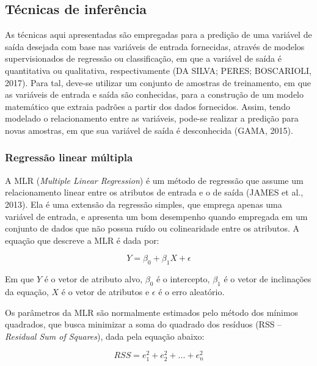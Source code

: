 
\subsection{Técnicas de inferência}

As técnicas aqui apresentadas são empregadas para a predição de uma variável de saída desejada com base nas variáveis de entrada fornecidas, através de modelos supervisionados de regressão ou classificação, em que a variável de saída é quantitativa ou qualitativa, respectivamente (DA SILVA; PERES; BOSCARIOLI, 2017). Para tal, deve-se utilizar um conjunto de amostras de treinamento, em que as variáveis de entrada e saída são conhecidas, para a construção de um modelo matemático que extraia padrões a partir dos dados fornecidos. Assim, tendo modelado o relacionamento entre as variáveis, pode-se realizar a predição para novas amostras, em que sua variável de saída é desconhecida (GAMA, 2015).

\subsubsection{Regressão linear múltipla}

A MLR (\textit{Multiple Linear Regression}) é um método de regressão que assume um relacionamento linear entre os atributos de entrada e o de saída (JAMES et al., 2013). Ela é uma extensão da regressão simples, que emprega apenas uma variável de entrada, e apresenta um bom desempenho quando empregada em um conjunto de dados que não possua ruído ou colinearidade entre os atributos. A equação que descreve a MLR é dada por:

\begin{equation} \label{eq:mlr}
	Y = \beta_0 + \beta_1 X + \epsilon
\end{equation}

Em que $Y$ é o vetor de atributo alvo, $\beta_0$ é o intercepto, $\beta_1$ é o vetor de inclinações da equação, $X$ é o vetor de atributos e $\epsilon$ é o erro aleatório. 

Os parâmetros da MLR são normalmente estimados pelo método dos mínimos quadrados, que busca minimizar a soma do quadrado dos resíduos (RSS – \textit{Residual Sum of Squares}), dada pela equação abaixo:

\begin{equation} \label{eq:rss}
	RSS = e_1^2 + e_2^2 + ... + e_n^2
\end{equation}


